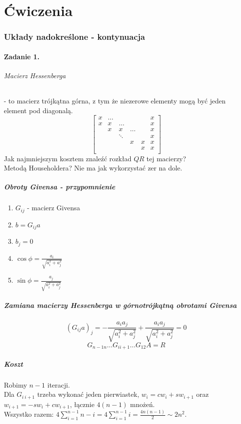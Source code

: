 \documentclass{article}
\begin{document}
\part{Ćwiczenia}
\section{Układy nadokreślone - kontynuacja}
\subsection{Zadanie 1.}
\paragraph{Macierz Hessenberga} - to macierz trójkątna górna, z tym że niezerowe elementy mogą być jeden element pod diagonalą.
$$\begin{bmatrix}
	x&\ldots&&&&x\\
	x&x&\ldots&&&x\\
	&x&x&\ldots&&x\\
	&&\ddots&&&x\\
	&&&x&x&x\\
	&&&&x&x\\
\end{bmatrix}$$
Jak najmniejszym kosztem znaleźć rozkład $ QR $ tej macierzy?\\
Metodą Householdera? Nie ma jak wykorzystać zer na dole.
\subsubsection{Obroty Givensa - przypomnienie}
\begin{enumerate}
	\item $ G_{ij} $ - macierz Givensa
	\item $ b=G_{ij}a$
	\item $ b_j=0 $
	\item $ \cos\phi = \frac{a_i}{\sqrt{a_i^2+a_j^2}} $
	\item $ \sin\phi = \frac{a_j}{\sqrt{a_i^2+a_j^2}} $
\end{enumerate}

\subsubsection{Zamiana macierzy Hessenberga w górnotrójkątną obrotami Givensa}
$$ (G_{ij}a)_j = -\frac{a_ia_j}{\sqrt{a_i^2 + a_j^2}}+\frac{a_ia_j}{\sqrt{a_i^2 + a_j^2}}=0$$
$$G_{n-1 n}\ldots G_{i i+1}\ldots G_{12}A=R$$
\subsubsection{Koszt}
Robimy $ n-1 $ iteracji.\\
Dla $ G_{i\ i+1} $ trzeba wykonać jeden pierwiastek, $ w_i =cw_i+sw_{i+1}$ oraz $w_{i+1} = -sw_i + cw_{i+1}$, łącznie $4(n-1) $ mnożeń.\\
Wszystko razem: $4\sum_{i=1}^{n-1}n-i=4\sum_{i=1}^{n-1}i=\frac{4n(n-1)}{2}\sim2n^2$.
\end{document}
